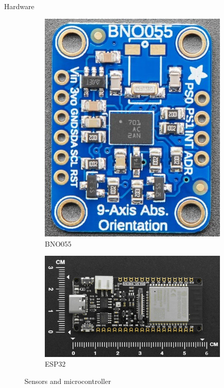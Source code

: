 \documentclass[aspectratio=169]{beamer}
\begin{document}
\begin{frame}{Hardware}
\begin{figure}
\begin{subfigure}{0.14\textwidth}
        \includegraphics[width=\linewidth]{bno055_sensor.jpg}
        \caption{BNO055}
        \label{fig:bno_sensor}
    \end{subfigure}
    \begin{subfigure}{0.27\textwidth}
        \centering
        \includegraphics[width=\linewidth]{esp32.jpg}
        \caption{ESP32}
        \label{fig:esp32}
    \end{subfigure}
    \caption{
      Sensors and microcontroller
    }
    \label{fig:sensor_system}
\end{figure}
\end{frame}
\end{document}
